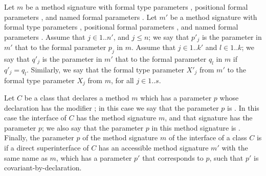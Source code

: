 \documentclass[makeidx]{article}
\begin{document}
\LMHash{}%
%
Let $m$ be a method signature with formal type parameters
,
positional formal parameters ,
%
and named formal parameters .
%
Let $m'$ be a method signature with formal type parameters
,
positional formal parameters ,
%
and named formal parameters .
%
Assume that $j \in 1 .. n'$, and $j \leq n$;
we say that $p'_j$ is the parameter in $m'$ that
to the formal parameter $p_j$ in $m$.
Assume that $j \in 1 .. k'$ and $l \in 1 .. k$;
we say that $q'_j$ is the parameter in $m'$ that
 to the formal parameter
$q_l$ in $m$ if $q'_j = q_l$.
%
Similarly, we say that the formal type parameter
$X'_j$ from $m'$
 to the formal type parameter
$X_j$ from $m$, for all $j \in 1 .. s$.



\LMHash{}%
%
Let $C$ be a class that declares
a method $m$ which has
a parameter $p$ whose declaration has the modifier \COVARIANT;
in this case we say that the parameter $p$ is
.
%
In this case the interface of $C$ has the method signature $m$,
and that signature has the parameter $p$;
we also say that the parameter $p$ in this method signature is
.
%
Finally, the parameter $p$ of the method signature $m$
of the interface of a class $C$ is
if a direct superinterface of $C$
has an accessible method signature $m'$ with the same name as $m$,
which has a parameter $p'$ that corresponds to $p$,
such that $p'$ is covariant-by-declaration.
\end{document}

